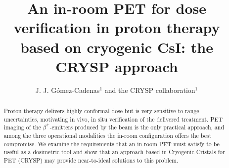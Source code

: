 \documentclass{iopjournal}
\begin{document}

\title{An in-room PET for dose verification in proton therapy
based on cryogenic CsI: the CRYSP approach}

\author{J. J. G\'omez-Cadenas$^{1}$ and the CRYSP collaboration$^{1}$}




\begin{abstract}
 Proton therapy delivers highly conformal dose but is
very sensitive to range uncertainties, motivating in vivo, in situ
verification of the delivered treatment. PET imaging of the
$\beta^{+}$-emitters produced by the beam is the only practical approach,
and among the three operational modalities the in-room configuration offers
the best compromise. We examine the requirements that an in-room PET must
satisfy to be useful as a dosimetric tool and show that an approach based in Cryogenic Cristals for PET (CRYSP) may provide near-to-ideal solutions to this problem. %
\end{abstract}
\end{document}
